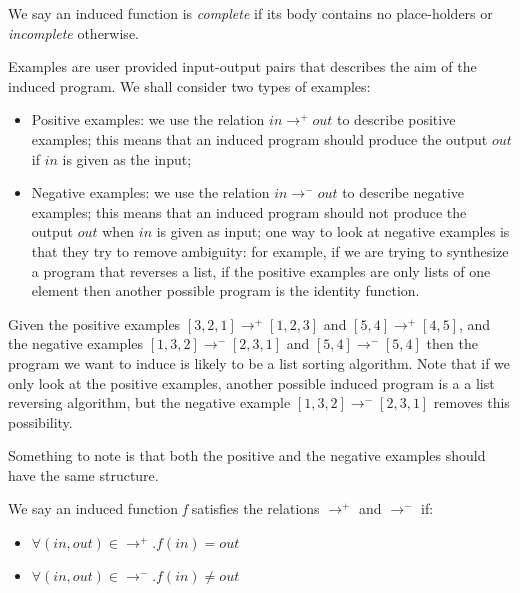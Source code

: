 \indent We say an induced function is \textit{complete} if its body contains no place-holders or \textit{incomplete} otherwise. 

\begin{defn}
Examples are user provided input-output pairs that describes the aim of the induced program.
We shall consider two types of examples:
\begin{itemize}
	\item Positive examples: we use the relation $in \rightarrow^{+} out$ to describe positive examples; this means that an induced program should produce the output $out$ if $in$ is given as the input;
	\item Negative examples: we use the relation $in \rightarrow^{-} out$ to describe negative examples; this means that an induced program should not produce the output $out$ when $in$ is given as input;  one way to look at negative examples is that they try to remove ambiguity: for example, if we are trying to synthesize a program that reverses a list, if the positive examples are only lists of one element then another possible program is the identity function.
\end{itemize}
\end{defn}

\begin{exam}
Given the positive examples $[3,2,1] \rightarrow^{+} [1,2,3]$ and $[5, 4] \rightarrow^{+} [4, 5]$, and the negative examples $[1,3,2] \rightarrow^{-} [2,3,1]$ and $[5,4] \rightarrow^{-} [5,4]$ then the program we want to induce is likely to be a list sorting algorithm. Note that if we only look at the positive examples, another possible induced program is a a list reversing algorithm, but the negative example $[1,3,2] \rightarrow^{-} [2,3,1]$ removes this possibility.
\end{exam}
Something to note is that both the positive and the negative examples should have the same structure.

\begin{defn}
We say an induced function \textit{f} satisfies the relations $\rightarrow^{+}$ and $\rightarrow^{-}$ if:
\begin{itemize}
\item $\forall (in, out) \in \rightarrow^{+} . f(in) = out$ 
\item $\forall (in, out) \in \rightarrow^{-} . f(in) \neq out$ 
\end{itemize}
\end{defn}

